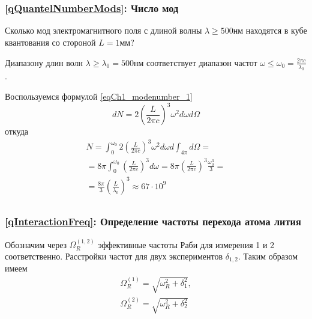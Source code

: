 \chapter{}

\section{} 

\subsection{\ref{qQuantelNumberMods}: Число мод}
Сколько мод электромагнитного поля с длиной волны
  $\lambda \ge 500 \mbox{нм}$ находятся в кубе квантования со стороной
$L=1 \mbox{мм}$?

Диапазону длин волн $\lambda \ge \lambda_0 = 500 \mbox{нм}$
соответствует диапазон частот
$\omega \le \omega_0 = \frac{2 \pi c}{\lambda_0}$.

Воспользуемся формулой \ref{eqCh1_modenumber_1}
\[
d N = 2 \left(\frac{L}{2 \pi c} \right)^3 \omega^2 d \omega d \Omega
\]
откуда
\begin{eqnarray}
  N = \int_0^{\omega_0} 2 \left(\frac{L}{2 \pi c} \right)^3 \omega^2 d
  \omega d \int_{4 \pi} d \Omega =
  \nonumber \\
  = 8 \pi \int_0^{\omega_0} \left(\frac{L}{2 \pi c} \right)^3 d \omega
  = 8 \pi \left(\frac{L}{2 \pi c}\right)^3 \frac{\omega_0^3}{3} =
  \nonumber \\
  = \frac{8 \pi}{3} \left(\frac{L}{\lambda_0}\right)^3 \approx 67
  \cdot 10^9
  \nonumber
\end{eqnarray}


\section{}

\subsection{\ref{qInteractionFreq}: Определение частоты перехода атома
лития} 

%

Обозначим через $\Omega_R^{(1,2)}$ эффективные частоты Раби для
измерения 1 и 2 соответственно. Расстройки частот для двух
экспериментов $\delta_{1,2}$. Таким образом имеем
\begin{eqnarray}
  \Omega_R^{(1)} = \sqrt{\omega_R^2 + \delta_1^2},
  \nonumber \\
  \Omega_R^{(2)} = \sqrt{\omega_R^2 + \delta_2^2}
  \label{eqAnswersInteraction40}
\end{eqnarray}

